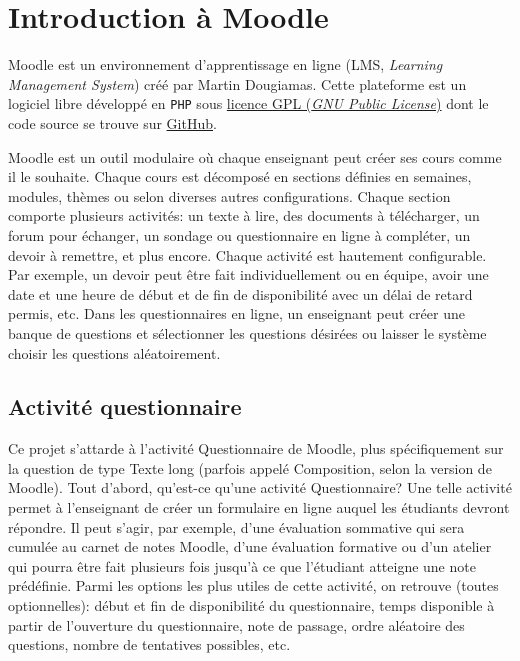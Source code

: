 \chapter{Introduction \`a Moodle}
Moodle est un environnement d'apprentissage en ligne (LMS, \textit{Learning Management System}) cr\'e\'e par Martin Dougiamas.
%
%
%
%
Cette plateforme est un logiciel libre d\'evelopp\'e en \texttt{PHP} sous \href{http://docs.moodle.org/dev/License}{licence GPL (\textit{GNU Public License})} dont le code source se trouve sur \href{https://github.com/moodle/moodle}{GitHub}.

Moodle est un outil modulaire o\`u chaque enseignant peut cr\'eer ses cours comme il le souhaite.
Chaque cours est d\'ecompos\'e en sections d\'efinies en semaines, modules, th\`emes ou selon diverses autres configurations.
Chaque section comporte plusieurs activit\'es: un texte \`a lire, des documents \`a t\'el\'echarger, un forum pour \'echanger, un sondage ou questionnaire en ligne \`a compl\'eter, un devoir \`a remettre, et plus encore.
Chaque activit\'e est hautement configurable.
Par exemple, un devoir peut \^etre fait individuellement ou en \'equipe, avoir une date et une heure de d\'ebut et de fin de disponibilit\'e avec un d\'elai de retard permis, etc.
Dans les questionnaires en ligne, un enseignant peut cr\'eer une banque de questions et s\'electionner les questions d\'esir\'ees ou laisser le syst\`eme choisir les questions al\'eatoirement.

\section{Activit\'e questionnaire}
Ce projet s'attarde \`a l'activit\'e Questionnaire de Moodle, plus sp\'ecifiquement sur la question de type Texte long (parfois appel\'e Composition, selon la version de Moodle).
Tout d'abord, qu'est-ce qu'une activit\'e Questionnaire?
Une telle activit\'e permet \`a l'enseignant de cr\'eer un formulaire en ligne auquel les \'etudiants devront r\'epondre.
Il peut s'agir, par exemple, d'une \'evaluation sommative qui sera cumul\'ee au carnet de notes Moodle, d'une \'evaluation formative ou d'un atelier qui pourra \^etre fait plusieurs fois jusqu'\`a ce que l'\'etudiant atteigne une note pr\'ed\'efinie.
Parmi les options les plus utiles de cette activit\'e, on retrouve (toutes optionnelles): d\'ebut et fin de disponibilit\'e du questionnaire, temps disponible \`a partir de l'ouverture du questionnaire, note de passage, ordre al\'eatoire des questions, nombre de tentatives possibles, etc.

